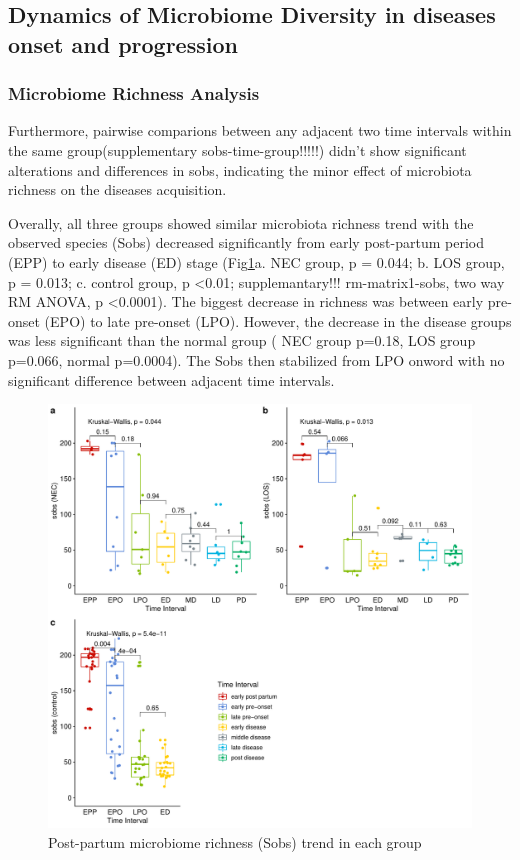 \documentclass[fleqn,10pt]{wlpeerj} %
\begin{document}
   \subsection*{Dynamics of Microbiome Diversity in diseases onset and progression}
    \subsubsection*{Microbiome Richness Analysis}
    Furthermore, pairwise comparions between any adjacent two time intervals within the same group(supplementary sobs-time-group!!!!!) didn't show significant alterations and differences in sobs, indicating the minor effect of microbiota richness on the diseases acquisition.

    Overally, all three groups showed similar microbiota richness trend with the observed species (Sobs) decreased significantly from early post-partum period (EPP) to early disease (ED) stage (Fig\ref{fig:sobs-group-time}a. NEC group, p = 0.044; b. LOS group, p = 0.013; c. control group, p \textless 0.01; supplemantary!!! rm-matrix1-sobs, two way RM ANOVA, p \textless 0.0001).  The biggest decrease in richness was between early pre-onset (EPO) to late pre-onset (LPO).  However, the decrease in the disease groups was less significant than the normal group ( NEC group p=0.18, LOS group p=0.066, normal p=0.0004). The Sobs then stabilized from LPO onword with no significant difference between adjacent time intervals.

      \begin{figure}[ht]\centering
        \includegraphics[width=\linewidth]{figure/sobs-group-time.pdf}
        \caption{Post-partum microbiome richness (Sobs) trend in each group}
        \label{fig:sobs-group-time}
      \end{figure}
\end{document}
